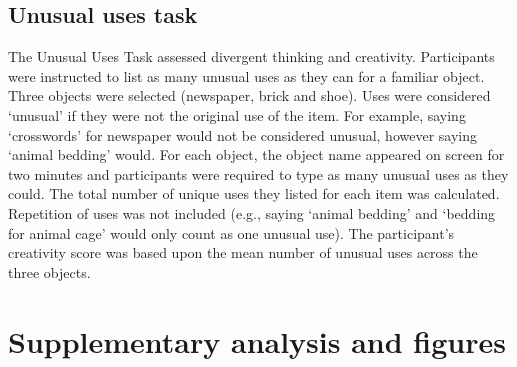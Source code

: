 \subsection{Unusual uses task}
The Unusual Uses Task \cite{Guilford1967} assessed divergent thinking and creativity. Participants were instructed to list as many unusual uses as they can for a familiar object. Three objects were selected (newspaper, brick and shoe). Uses were considered ‘unusual’ if they were not the original use of the item. For example, saying ‘crosswords’ for newspaper would not be considered unusual, however saying ‘animal bedding’ would. For each object, the object name appeared on screen for two minutes and participants were required to type as many unusual uses as they could. The total number of unique uses they listed for each item was calculated. Repetition of uses was not included (e.g., saying ‘animal bedding’ and ‘bedding for animal cage’ would only count as one unusual use).  The participant’s creativity score was based upon the mean number of unusual uses across the three objects.

\section{Supplementary analysis and figures}
\label{appendix:study1:subsection3}

